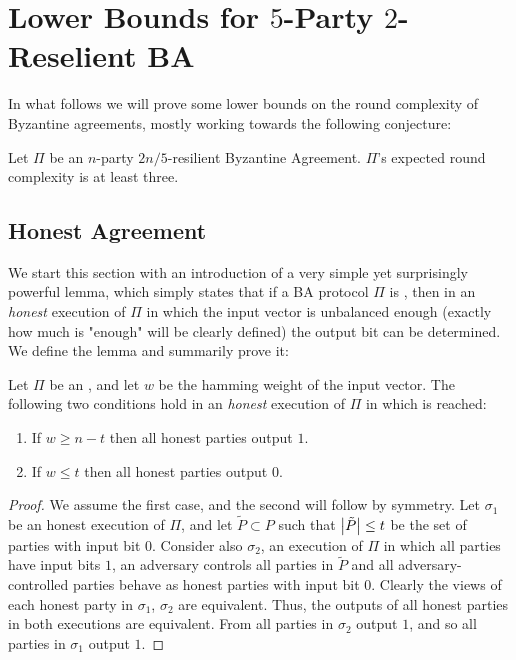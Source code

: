 
\section{Lower Bounds for \texorpdfstring{$5$}{Lg}-Party \texorpdfstring{$2$}{Lg}-Reselient BA}

In what follows we will prove some lower bounds on the round complexity of Byzantine agreements, mostly working towards the following conjecture:

\begin{conjecture}
	Let $\Pi$ be an $n$-party $2n/5$-resilient Byzantine Agreement. $\Pi$'s expected round complexity is at least three.
\end{conjecture}

\subsection{Honest Agreement}
We start this section with an introduction of a very simple yet surprisingly powerful lemma, which simply states that if a BA protocol $\Pi$ is \tres, then in an \emph{honest} execution of $\Pi$ in which the input vector is unbalanced enough (exactly how much is "enough" will be clearly defined) the output bit can be determined. We define the lemma and summarily prove it:

\begin{lemma}\label{honestagreementlemma}
	Let $\Pi$ be an , and let $w$ be the hamming weight of the input vector. The following two conditions hold in an \emph{honest} execution of $\Pi$ in which \agr is reached: 
	\begin{enumerate}
		\item If $w \geq n-t$ then all honest parties output $1$.
		\item If $w \leq t$ then all honest parties output $0$.
	\end{enumerate}
\end{lemma}

\begin{proof}
	We assume the first case, and the second will follow by symmetry. Let $\sigma_1$ be an honest execution of $\Pi$, and let $\tilde{P} \subset P$ such that $\left|\tilde{P}\right|  \leq t$ be the set of parties with input bit $0$. Consider also $\sigma_2$, an execution of $\Pi$ in which all parties have input bits $1$, an adversary controls all parties in $\tilde{P}$ and all adversary-controlled parties behave as honest parties with input bit $0$. Clearly the views of each honest party in $\sigma_1$, $\sigma_2$ are equivalent. Thus, the outputs of all honest parties in both executions are equivalent. From \val all parties in $\sigma_2$ output $1$, and so all parties in $\sigma_1$ output $1$.
\end{proof}

